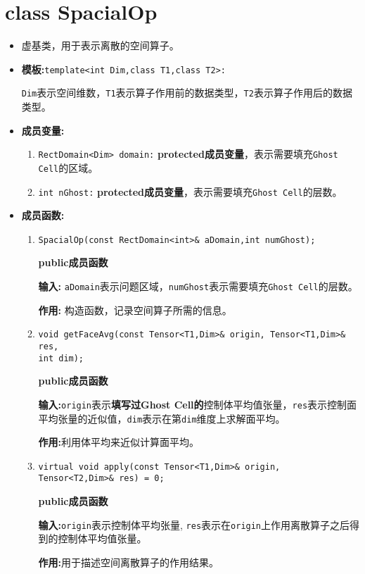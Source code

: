 \documentclass[UTF8]{ctexart}
\theoremstyle{plain}
\theoremstyle{definition}
\theoremstyle{remark}
\begin{document}
\section{class SpacialOp}
\begin{itemize}
    \item 虚基类，用于表示离散的空间算子。
    \item \textbf{模板:}\texttt{template<int Dim,class T1,class T2>:}
    
    \texttt{Dim}表示空间维数，\texttt{T1}表示算子作用前的数据类型，\texttt{T2}表示算子作用后的数据类型。

    \item \textbf{成员变量:}
    \begin{enumerate}
        \item \texttt{RectDomain<Dim> domain:} \textbf{protected成员变量}，表示需要填充\texttt{Ghost Cell}的区域。
        \item \texttt{int nGhost:} \textbf{protected成员变量}，表示需要填充\texttt{Ghost Cell}的层数。
    \end{enumerate}

    \item \textbf{成员函数:}
    \begin{enumerate}
        \item \texttt{SpacialOp(const RectDomain<int>\& aDomain,int numGhost);}
        
        \textbf{public成员函数}

        \textbf{输入:} \texttt{aDomain}表示问题区域，\texttt{numGhost}表示需要填充\texttt{Ghost Cell}的层数。

        \textbf{作用:} 构造函数，记录空间算子所需的信息。

        \item \texttt{void getFaceAvg(const Tensor<T1,Dim>\& origin, Tensor<T1,Dim>\& res,\\ int dim);}
        
        \textbf{public成员函数}

        \textbf{输入:}\texttt{origin}表示\textbf{填写过Ghost Cell的}控制体平均值张量，\texttt{res}表示控制面平均张量的近似值，\texttt{dim}表示在第\texttt{dim}维度上求解面平均。

        \textbf{作用:}利用体平均来近似计算面平均。

        \item \texttt{virtual void apply(const Tensor<T1,Dim>\& origin, Tensor<T2,Dim>\& res) = 0;}
        
        \textbf{public成员函数}

        \textbf{输入:}\texttt{origin}表示控制体平均张量, \texttt{res}表示在\texttt{origin}上作用离散算子之后得到的控制体平均值张量。

        \textbf{作用:}用于描述空间离散算子的作用结果。
    \end{enumerate}
\end{itemize}
\end{document}
